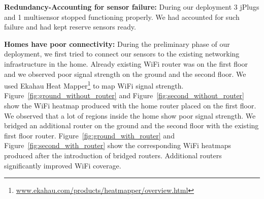 \documentclass[10pt]{sensys-proc}
\newcommand{\figref}[1]{Figure~\ref{#1}}
\begin{document}
\noindent \textbf{Redundancy-Accounting for sensor failure:} During our deployment 3 jPlugs and 1 multisensor stopped functioning properly. We had accounted for such failure and had kept reserve sensors ready. %

\noindent \textbf{Homes have poor connectivity:} During the preliminary phase of our deployment, we first tried to connect our sensors to the existing networking infrastructure in the home. Already existing WiFi router was on the first floor and we observed poor signal strength on the ground and the second floor. We used Ekahau Heat Mapper\footnote{\url{www.ekahau.com/products/heatmapper/overview.html}} to map WiFi signal strength. \figref{fig:ground_without_router} and \figref{fig:second_without_router} show the WiFi heatmap produced with the home router placed on the first floor. We observed that a lot of regions inside the home show poor signal strength. We bridged an additional router on the ground and the second floor with the existing first floor router. \figref{fig:ground_with_router} and \figref{fig:second_with_router} show the corresponding WiFi heatmaps produced after the introduction of bridged routers. Additional routers significantly improved WiFi coverage. 

\end{document}
